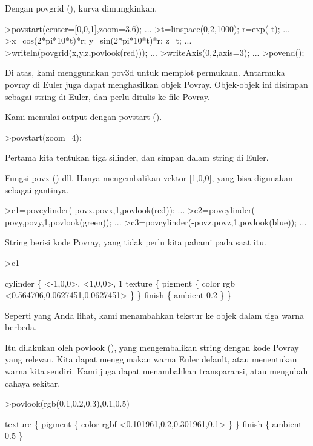 \documentclass[a4paper,10pt]{article}
\begin{document}
\begin{eulernotebook}
\begin{eulercomment}
\begin{eulercomment}
\begin{eulercomment}
Dengan povgrid (), kurva dimungkinkan.
\end{eulercomment}
\begin{eulerprompt}
>povstart(center=[0,0,1],zoom=3.6); ...
>t=linspace(0,2,1000); r=exp(-t); ...
>x=cos(2*pi*10*t)*r; y=sin(2*pi*10*t)*r; z=t; ...
>writeln(povgrid(x,y,z,povlook(red))); ...
>writeAxis(0,2,axis=3); ...
>povend();
\end{eulerprompt}
\begin{eulercomment}
Di atas, kami menggunakan pov3d untuk memplot permukaan. Antarmuka
povray di Euler juga dapat menghasilkan objek Povray. Objek-objek ini
disimpan sebagai string di Euler, dan perlu ditulis ke file Povray.

Kami memulai output dengan povstart ().
\end{eulercomment}
\begin{eulerprompt}
>povstart(zoom=4);
\end{eulerprompt}
\begin{eulercomment}
Pertama kita tentukan tiga silinder, dan simpan dalam string di Euler.

Fungsi povx () dll. Hanya mengembalikan vektor [1,0,0], yang bisa
digunakan sebagai gantinya.
\end{eulercomment}
\begin{eulerprompt}
>c1=povcylinder(-povx,povx,1,povlook(red)); ...
>c2=povcylinder(-povy,povy,1,povlook(green)); ...
>c3=povcylinder(-povz,povz,1,povlook(blue)); ...
\end{eulerprompt}
\begin{eulercomment}
String berisi kode Povray, yang tidak perlu kita pahami pada saat itu.
\end{eulercomment}
\begin{eulerprompt}
>c1
\end{eulerprompt}
\begin{euleroutput}
  cylinder \{ <-1,0,0>, <1,0,0>, 1
   texture \{ pigment \{ color rgb <0.564706,0.0627451,0.0627451> \}  \} 
   finish \{ ambient 0.2 \} 
   \}
\end{euleroutput}
\begin{eulercomment}
Seperti yang Anda lihat, kami menambahkan tekstur ke objek dalam tiga
warna berbeda.

Itu dilakukan oleh povlook (), yang mengembalikan string dengan kode
Povray yang relevan. Kita dapat menggunakan warna Euler default, atau
menentukan warna kita sendiri. Kami juga dapat menambahkan
transparansi, atau mengubah cahaya sekitar.
\end{eulercomment}
\begin{eulerprompt}
>povlook(rgb(0.1,0.2,0.3),0.1,0.5)
\end{eulerprompt}
\begin{euleroutput}
   texture \{ pigment \{ color rgbf <0.101961,0.2,0.301961,0.1> \}  \} 
   finish \{ ambient 0.5 \} 
  

\end{euleroutput}
\end{eulercomment}
\end{eulercomment}
\end{eulernotebook}
\end{document}
